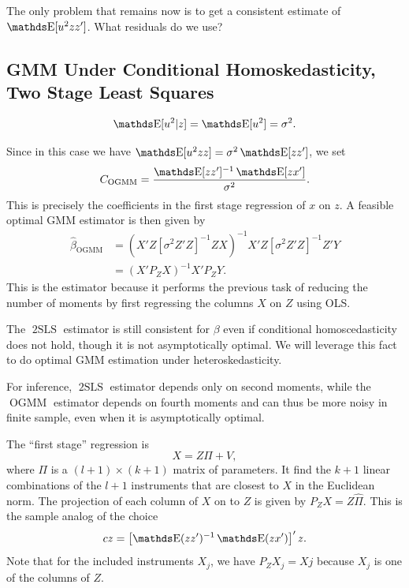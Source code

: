 \documentclass[letterpaper, 10pt]{article}
\DeclareMathOperator{\OGMM}{OGMM}
\DeclareMathOperator{\TSLS}{2SLS}
\begin{document}
The only problem that remains now is to get a consistent estimate of \(\E[u^2 zz']\).
What residuals do we use?


\subsection{GMM Under Conditional Homoskedasticity, Two Stage Least Squares}
\begin{assumption}
  \[
    \E[u^2|z]
    = \E[u^2] = \sigma^2.
  \]
\end{assumption}

Since in this case we have \(\E[u^2 zz] = \sigma^2 \E[zz']\), we set
\[
  C_{\OGMM} = \frac{\E[zz']^{-1}\E[zx']}{\sigma^2}.
\]
This is precisely the coefficients in the first stage regression of \(x\) on \(z\).
A feasible optimal GMM estimator is then given by
\begin{align*}
  \hat{\beta}_{\OGMM}
  &= (X' Z [\sigma^2 Z' Z]^{-1} Z X)^{-1} X' Z [\sigma^2 Z' Z]^{-1} Z' Y \\
  &= (X' P_Z X)^{-1} X' P_Z Y.
\end{align*}
This is the  estimator because it performs the previous task of reducing the number of moments by first regressing the columns \(X\) on \(Z\) using OLS.

\begin{remark}
  The \(\TSLS\) estimator is still consistent for \(\beta\) even if conditional homoscedasticity does not hold, though it is not asymptotically optimal.
  We will leverage this fact to do optimal GMM estimation under heteroskedasticity.
\end{remark}
\begin{remark}
  For inference, \(\TSLS\) estimator depends only on second moments, while the \(\OGMM\) estimator depends on fourth moments and can thus be more noisy in finite sample, even when it is asymptotically optimal.
\end{remark}


The ``first stage'' regression is
\[
  X = Z \Pi + V,
\]
where \(\Pi\) is a \((l + 1) \times (k + 1)\) matrix of parameters.
It find the \(k + 1\) linear combinations of the \(l + 1\) instruments that are closest to \(X\) in the Euclidean norm.
The projection of each column of \(X\) on to \(Z\) is given by \(P_Z X = Z \hat{\Pi}\).
This is the sample analog of the choice
\[
  cz
  = \left[ \E(zz')^{-1} \E(zx') \right]' z.
\]
Note that for the included instruments \(X_j\), we have \(P_Z X_j = Xj\) because \(X_j\) is one of the columns of \(Z\).
\end{document}
